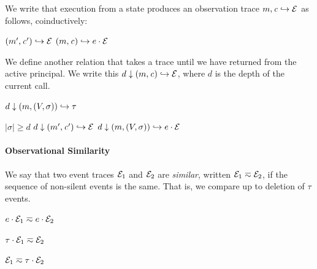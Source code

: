 \documentclass[10pt,conference]{ieeetran}%
\theoremstyle{definition}
\begin{document}
We write that execution from a state produces an observation trace
\(m,\mathit{c} \hookrightarrow \mathcal{E}\) as follows, coinductively:

            {\((m',\mathit{c}') \hookrightarrow \mathcal{E}\)}
            {\((m,\mathit{c}) \hookrightarrow e \cdot \mathcal{E}\)}

We define another relation that takes a trace until we have returned from the
active principal.
We write this \(d \downarrow (m,\mathit{c}) \hookrightarrow \mathcal{E}\), where
\(d\) is the depth of the current call.

         {\(d \downarrow (m,(V,\sigma)) \hookrightarrow \tau\)}

                  {\(|\sigma| \geq d\)}
                  {\(d \downarrow (m',\mathit{c}') \hookrightarrow \mathcal{E}\)}
                  {\(d \downarrow (m,(V,\sigma)) \hookrightarrow e \cdot \mathcal{E}\)}

\paragraph*{Observational Similarity}

We say that two event traces $\mathcal{E}_1$ and $\mathcal{E}_2$ are {\em similar},
written \(\mathcal{E}_1 \eqsim \mathcal{E}_2\), if the sequence of non-silent events
is the same. That is, we compare up to deletion of \(\tau\) events.

\begin{minipage}{.4\columnwidth}
  \judgment{}{\(\obsT \eqsim \obsT\)}
\end{minipage}
\begin{minipage}{.4\columnwidth}
           {\(e \cdot \mathcal{E}_1 \eqsim e \cdot \mathcal{E}_2\)}
\end{minipage}

\begin{minipage}{.4\columnwidth}
           {\(\tau \cdot \mathcal{E}_1 \eqsim \mathcal{E}_2\)}
\end{minipage}
\begin{minipage}{.4\columnwidth}
           {\(\mathcal{E}_1 \eqsim \tau \cdot \mathcal{E}_2\)}
\end{minipage}
\end{document}
